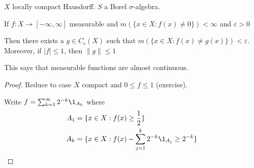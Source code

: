 $X$ locally compact Hausdorff. $S$ a Borel $\sigma$-algebra.

 
 \begin{theorem}[Lusin]
	 If $f: X \to [-\infty, \infty]$  measurable and $m(\{x \in X : f(x) \neq 0 \} ) < \infty$ and  $\varepsilon > 0$

	 Then there exists a $g \in C_{c} (X) $ such that $m( \{ x \in X : f(x) \neq g(x) \} ) < \varepsilon$.
	 Moreover, if $|f| \leq 1$, then $ \|g\| \leq 1$
 \end{theorem}
 
 \begin{remark}
 	This says that measurable functions are almost continuous.
 \end{remark}
 
\begin{proof}
	Reduce to case $X$ compact and $0 \leq f \leq 1$ (exercise).

	Write $f = \sum_{k=1}^{\infty} 2^{-k} \1_{A_{k}}$ where 
	\begin{align*}
		A_{1} &= \{ x \in X : f(x) \geq \frac{1}{2} \} \\
		A_{k} &= \{ x \in X : f(x) - \sum_{j=1}^{k} 2^{-k} \1_{A_{j}} \geq 2^{-k} \}
	\end{align*}
\end{proof}
 
